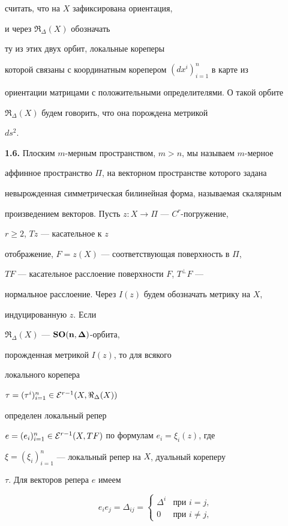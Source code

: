считать, что на $X$ зафиксирована ориентация,


и через $\Re_{\Delta}(X)$ обозначать


ту из этих двух орбит, локальные кореперы


которой связаны с координатным корепером $(dx^i)_{i=1}^n$ в карте из


ориентации матрицами с положительными определителями. О такой орбите


$\Re_{\Delta}(X)$ будем говорить, что она порождена метрикой


$ds^2$.


\medskip





{\bf 1.6.} Плоским $m$-мерным пространством, $m>n$, мы называем $m$-мерное


аффинное пространство $\Pi$, на векторном пространстве которого задана


невырожденная симметрическая билинейная форма, называемая скалярным


произведением векторов. Пусть $z:X\to\Pi$ --- $C^r$-погружение,


$r\ge 2$, $Tz$ --- касательное к $z$


отображение, $F=z(X)$ --- соответствующая поверхность в $\Pi$,


$TF$ --- касательное расслоение поверхности $F$, $T^{\bot}F$ ---


нормальное расслоение. Через $I(z)$ будем обозначать метрику на $X$,


индуцированную $z$. Если


$\Re_{\Delta}(X)$ --- $\bold{SO(n,\boldsymbol\Delta)}$-орбита,


порожденная метрикой $I(z)$, то для всякого


локального корепера


$\tau=(\tau^i)_{i=1}^n\in{\cal E}^{r-1}(X,\Re_{\Delta}(X))$


определен локальный репер


$e=(e_i)_{i=1}^n\in{\cal E}^{r-1}(X,TF)$ по формулам $e_i=\xi_i(z)$, где


$\xi=(\xi_i)_{i=1}^n$ --- локальный репер на $X$, дуальный кореперу


$\tau$. Для векторов репера $e$ имеем


\begin{equation}


e_ie_j=\Delta_{ij}=


\begin{cases}


\Delta^i & \text{при }i=j,\\


0 & \text{при }i\ne j,


\end{cases}


\end{equation}


